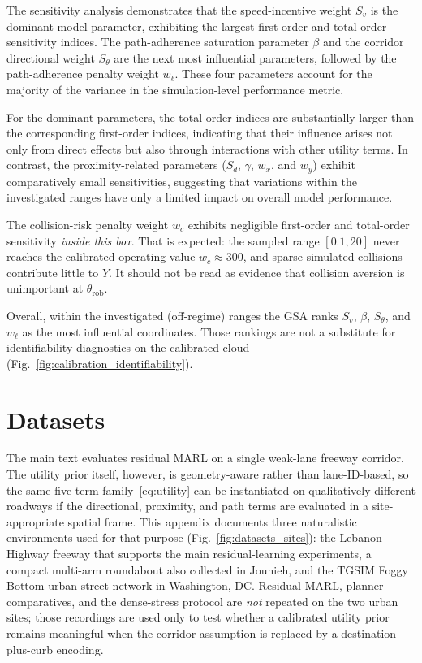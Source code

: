 \documentclass[conference]{IEEEtran}
\begin{document}
The sensitivity analysis demonstrates that the speed-incentive weight \(S_v\) is the dominant model parameter, exhibiting the largest first-order and total-order sensitivity indices. The path-adherence saturation parameter \(\beta\) and the corridor directional weight \(S_{\theta}\) are the next most influential parameters, followed by the path-adherence penalty weight \(w_{\ell}\). These four parameters account for the majority of the variance in the simulation-level performance metric.

For the dominant parameters, the total-order indices are substantially larger than the corresponding first-order indices, indicating that their influence arises not only from direct effects but also through interactions with other utility terms. In contrast, the proximity-related parameters (\(S_d\), \(\gamma\), \(w_x\), and \(w_y\)) exhibit comparatively small sensitivities, suggesting that variations within the investigated ranges have only a limited impact on overall model performance.

The collision-risk penalty weight \(w_c\) exhibits negligible first-order and total-order sensitivity \emph{inside this box}. That is expected: the sampled range \([0.1,20]\) never reaches the calibrated operating value \(w_c\approx 300\), and sparse simulated collisions contribute little to \(Y\). It should not be read as evidence that collision aversion is unimportant at \(\theta_{\mathrm{rob}}\).

Overall, within the investigated (off-regime) ranges the GSA ranks \(S_v\), \(\beta\), \(S_{\theta}\), and \(w_{\ell}\) as the most influential coordinates. Those rankings are not a substitute for identifiability diagnostics on the calibrated cloud (Fig.~\ref{fig:calibration_identifiability}).


\section{Datasets}
\label{app:datasets}

The main text evaluates residual MARL on a single weak-lane freeway corridor. The utility prior itself, however, is geometry-aware rather than lane-ID-based, so the same five-term family~\eqref{eq:utility} can be instantiated on qualitatively different roadways if the directional, proximity, and path terms are evaluated in a site-appropriate spatial frame. This appendix documents three naturalistic environments used for that purpose (Fig.~\ref{fig:datasets_sites}): the Lebanon Highway freeway that supports the main residual-learning experiments, a compact multi-arm roundabout also collected in Jounieh, and the TGSIM Foggy Bottom urban street network in Washington, DC. Residual MARL, planner comparatives, and the dense-stress protocol are \emph{not} repeated on the two urban sites; those recordings are used only to test whether a calibrated utility prior remains meaningful when the corridor assumption is replaced by a destination-plus-curb encoding.
\end{document}

